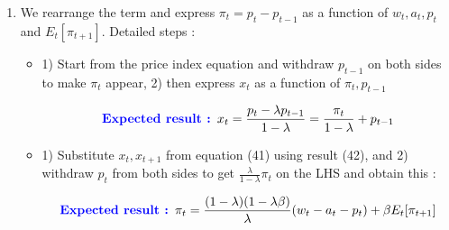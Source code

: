 \documentclass{article}
\begin{document}
\begin{enumerate}
    \item We rearrange the term and express $\pi_t = p_t-p_{t-1}$ as a function of $w_t,a_t,p_t$ and $E_t[\pi_{t+1}]$. Detailed steps : 
    \begin{itemize}
        \item 1) Start from the price index equation and withdraw $p_{t-1}$ on both sides to make $\pi_t$ appear, 2) then express $x_t$ as a function of $\pi_t,p_{t-1}$
                \begin{expectedresultsbox}
        \begin{equation}
            \textcolor{blue}{\textbf{Expected result : }} x_{t}=\frac{p_{t}-\lambda p_{t-1}}{1-\lambda} = \frac{\pi_{t}}{1-\lambda} +p_{t-1}
        \end{equation}
        \end{expectedresultsbox}
        \item 1) Substitute $x_t, x_{t+1}$ from equation (41) using result (42), and 2) withdraw $p_t$ from both sides to get $\frac{\lambda}{1-\lambda} \pi_t$ on the LHS and obtain this : 
        \begin{expectedresultsbox}
        \begin{equation}
            \textcolor{blue}{\textbf{Expected result : }} \pi_t = \frac{(1-\lambda)(1-\lambda\beta)}{\lambda}(w_t-a_t-p_t)+\beta E_t[\pi_{t+1}]
        \end{equation}
        \end{expectedresultsbox}
    \end{itemize}
\end{enumerate}
\end{document}
